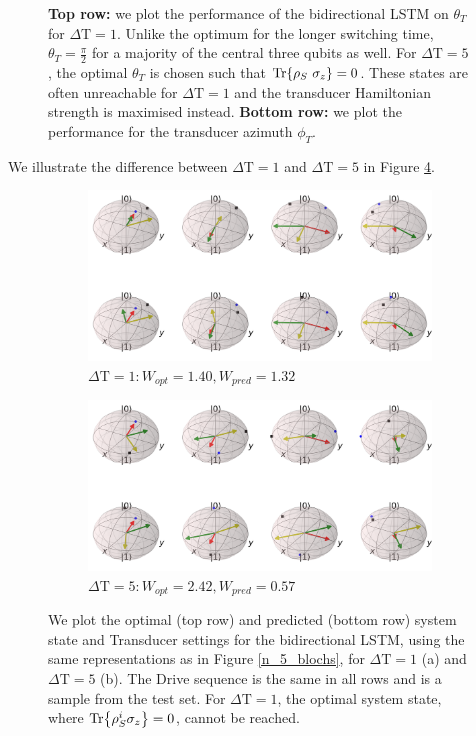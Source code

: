 \begin{figure}
\begin{subfigure}{0.32\textwidth}
	\end{subfigure}
	\caption{\textbf{Top row:} we plot the performance of the bidirectional LSTM on $\theta_T$ for $\Delta \mathrm{T} = 1$. Unlike the optimum for the longer switching time, $\theta_T = \frac{\pi}{2}$ for a majority of the central three qubits as well. For $\Delta \mathrm{T} = 5$, the optimal $\theta_T$ is chosen such that $\Tr{\rho_S \ \sigma_z} = 0$. These states are often unreachable for $\Delta \mathrm{T} = 1$ and the transducer Hamiltonian strength is maximised instead.  \textbf{Bottom row:} we plot the performance for the transducer azimuth $\phi_T$.}
	\label{dt1box}
\end{figure}

We illustrate the difference between $\Delta \mathrm{T} = 1$ and $\Delta \mathrm{T} = 5$ in Figure \ref{blochsdt15}.


\begin{figure}
	\centering
	\begin{subfigure}{0.85\textwidth}
		\centering
		\includegraphics[width=\textwidth]{img/bloch_comp_1_crop}
		\caption{$\Delta \mathrm{T} = 1: W_{opt} = 1.40, W_{pred} = 1.32$}
		\label{}
	\end{subfigure}
	\begin{subfigure}{0.85\textwidth}
		\centering
		\includegraphics[width=\textwidth]{img/bloch_comp_5_crop}
		\caption{$\Delta \mathrm{T} = 5: W_{opt} = 2.42, W_{pred} = 0.57$}
		\label{}
	\end{subfigure}
	\caption{We plot the optimal (top row) and predicted (bottom row) system state and Transducer settings for the bidirectional LSTM, using the same representations as in Figure \ref{n_5_blochs}, for $\Delta \mathrm{T} = 1$ (a) and $\Delta \mathrm{T} = 5$ (b). The Drive sequence is the same in all rows and is a sample from the test set. For $\Delta \mathrm{T} = 1$, the optimal system state, where $\Tr{\rho_S^i \sigma_z} = 0$, cannot be reached.}
	\label{blochsdt15}
\end{figure}